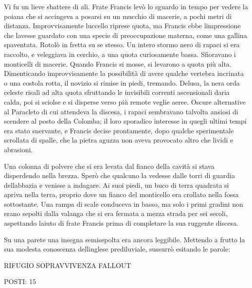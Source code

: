 Vi fu un lieve sbattere di ali. Frate Francis levò lo sguardo in tempo
per vedere la poiana che si accingeva a posarsi su un mucchio di
macerie, a pochi metri di distanza. Improvvisamente
l\textquotesingle uccello riprese quota, ma Francis ebbe
l\textquotesingle impressione che l\textquotesingle avesse guardato con
una specie di preoccupazione materna, come una gallina spaventata.
Rotolò in fretta su se stesso. Un intero stormo nero di rapaci si era
raccolto, e veleggiava in cerchio, a una quota curiosamente bassa.
Sfioravano i monticelli di macerie. Quando Francis si mosse, si levarono
a quota più alta. Dimenticando improvvisamente la possibilità di avere
qualche vertebra incrinata o una costola rotta, il novizio si rimise in
piedi, tremando. Delusa, la nera orda celeste risalì ad alta quota
sfruttando le invisibili correnti ascensionali d\textquotesingle aria
calda, poi si sciolse e si disperse verso più remote veglie aeree.
Oscure alternative al Paracleto di cui attendeva la discesa, i rapaci
sembravano talvolta ansiosi di scendere al posto della Colomba; il loro
sporadico interesse in quegli ultimi tempi era stato snervante, e
Francis decise prontamente, dopo qualche sperimentale scrollata di
spalle, che la pietra aguzza non aveva provocato altro che lividi e
abrasioni.

Una colonna di polvere che si era levata dal fianco della cavità si
stava disperdendo nella brezza. Sperò che qualcuno la vedesse dalle
torri di guardia dell\textquotesingle abbazia e venisse a indagare. Ai
suoi piedi, un buco di terra quadrata si apriva nella terra, proprio
dove un fianco del monticello era crollato nella fossa sottostante. Una
rampa di scale conduceva in basso, ma solo i primi gradini non erano
sepolti dalla valanga che si era fermata a mezza strada per sei secoli,
aspettando l\textquotesingle aiuto di frate Francis prima di completare
la sua ruggente discesa.

Su una parete una insegna semisepolta era ancora leggibile. Mettendo a
frutto la sua modesta conoscenza dell\textquotesingle inglese
prediluviale, sussurrò esitando le parole:
\begin{center}
	{\Large RIFUGIO SOPRAVVIVENZA FALLOUT }
\end{center}

\begin{center}
	{\large POSTI: 15}
\end{center}


